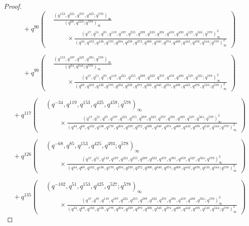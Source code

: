 \documentclass[11pt,a4paper]{article}
\numberwithin{equation}{section}
\theoremstyle{plain}
\begin{document}
\begin{proof}
	\[
	\quad +q^{90}\left(
	\begin{aligned}
		&\frac{(q^{153}, q^{221},  q^{357}, q^{425}; q^{578})_{\infty}}{(q^{68}, q^{510}; q^{578})_{\infty}} \\
		&\qquad \times
		\frac{(q^{17}, q^{51}, q^{85}, q^{119}, q^{187}, q^{255}, q^{289}, q^{323}, q^{391}, q^{459}, q^{493}, q^{527}, q^{561}; q^{578})_{\infty}^{2}}{(q^{34}, q^{102}, q^{136}, q^{170}, q^{204}, q^{238}, q^{272}, q^{306}, q^{340}, q^{374}, q^{408}, q^{442}, q^{476}, q^{544}; q^{578})_{\infty}^{2}}
	\end{aligned} 
	\right)
	\]
	
	\[
	\quad +q^{99}\left(
	\begin{aligned}
		&\frac{(q^{153}, q^{187}, q^{425}, q^{391}; q^{578})_{\infty}}{(q^{34}, q^{544}; q^{578})_{\infty}} \\
		&\qquad \times
		\frac{(q^{17}, q^{51}, q^{85}, q^{119}, q^{221}, q^{255}, q^{289}, q^{323}, q^{357}, q^{459}, q^{493}, q^{527}, q^{561}; q^{578})_{\infty}^{2}}{(q^{68}, q^{102}, q^{136}, q^{170}, q^{204}, q^{238}, q^{272}, q^{306}, q^{340}, q^{374}, q^{408}, q^{442}, q^{476}, q^{510}; q^{578})_{\infty}^{2}}
	\end{aligned}
	\right) 
	\]
	
	\[
	\quad + q^{117}\left(
	\begin{aligned}
		&(q^{-34}, q^{119}, q^{153}, q^{425}, q^{459}; q^{578})_{\infty} \\
		&\qquad \times
		\frac{
			(q^{17}, q^{51}, q^{85}, q^{187}, q^{221}, q^{255}, q^{289}, q^{323}, q^{357}, q^{391}, q^{493}, q^{527}, q^{561}; q^{578})_{\infty}^{2}
		}{
			(q^{34}, q^{68}, q^{102}, q^{136}, q^{170}, q^{204}, q^{238}, q^{272}, q^{306}, q^{340}, q^{374}, q^{408}, q^{442}, q^{476}, q^{510}, q^{544}; q^{578})_{\infty}^{2}
		}
	\end{aligned}
	\right)
	\]
	
	\[
	\quad +q^{126}\left(
	\begin{aligned}
		&(q^{-68}, q^{85}, q^{153}, q^{425}, q^{493}; q^{578})_{\infty} \\
		&\qquad \times
		\frac{(q^{17}, q^{51}, q^{119}, q^{187}, q^{221}, q^{255}, q^{289}, q^{323}, q^{357}, q^{391}, q^{459}, q^{527}, q^{561}; q^{578})_{\infty}^{2}}{(q^{34}, q^{68}, q^{102}, q^{136},q^{170}, q^{204}, q^{238}, q^{272}, q^{306}, q^{340}, q^{374}, q^{408}, q^{442}, q^{476}, q^{510}, q^{544}; q^{578})_{\infty}^{2}}
    \end{aligned} 
    \right)
	\]
	
	\[
	\quad +q^{135}\left(
	\begin{aligned}
		&(q^{-102}, q^{51}, q^{153}, q^{425}, q^{527}; q^{578})_{\infty} \\
		&\qquad \times
		\frac{(q^{17}, q^{85}, q^{119}, q^{187}, q^{221}, q^{255}, q^{289}, q^{323}, q^{357}, q^{391}, q^{459}, q^{493}, q^{561}; q^{578})_{\infty}^{2}}{(q^{34}, q^{68}, q^{102}, q^{136},q^{170}, q^{204}, q^{238}, q^{272}, q^{306}, q^{340}, q^{374}, q^{408}, q^{442}, q^{476}, q^{510}, q^{544}; q^{578})_{\infty}^{2}}
	\end{aligned}
	\right)
	\]
	

\end{proof}
\end{document}
